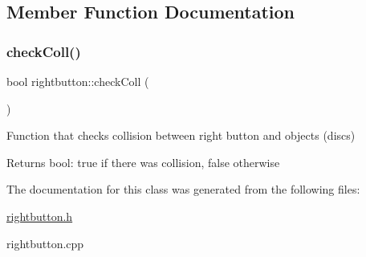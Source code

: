 \subsection{Member Function Documentation}
\mbox{\label{classrightbutton_a50b7acc734df9c1e17e2acd718ba4ee9}} 
\subsubsection{\texorpdfstring{check\+Coll()}{checkColl()}}
{\footnotesize\ttfamily bool rightbutton\+::check\+Coll (\begin{DoxyParamCaption}{ }\end{DoxyParamCaption})}



Function that checks collision between right button and objects (discs) 

\begin{DoxyReturn}{Returns}
bool\+: true if there was collision, false otherwise 
\end{DoxyReturn}


The documentation for this class was generated from the following files\+:\begin{DoxyCompactItemize}
\item 
\hyperlink{rightbutton_8h}{rightbutton.\+h}\item 
rightbutton.\+cpp\end{DoxyCompactItemize}
